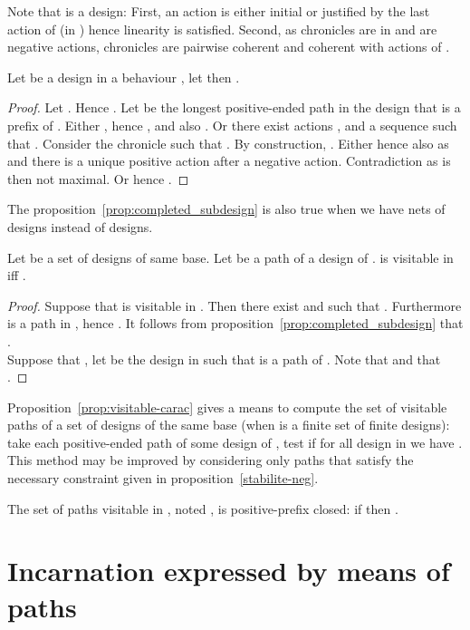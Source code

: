 \documentclass{LMCS}
\begin{document}
\noindent Note that  is a design:
First, an action  is either initial or justified by the last action of  (in ) hence linearity is satisfied.
Second, as chronicles  are in  and  are negative actions, chronicles  are pairwise coherent and coherent with actions of .

\begin{prop}\label{prop:completed_subdesign}
Let  be a design in a behaviour , let  then .
\end{prop}
\begin{proof}
Let . Hence . Let  be the longest positive-ended path in the design  that is a prefix of . 
Either , hence , and also . 
Or there exist actions ,  and a sequence  such that . 
Consider the chronicle  such that . By construction, . Either  hence also  as  and there is a unique positive action after a negative action. Contradiction as  is then not maximal. 
Or  hence .
\end{proof}

The proposition~\ref{prop:completed_subdesign} is also true when we have nets of designs instead of designs.

\begin{prop}\label{prop:visitable-carac}
Let  be a set of designs of same base.
Let  be a path of a design of .
 is visitable in  iff .
\end{prop}
\begin{proof}
Suppose that  is visitable in . Then there exist  and  such that . 
Furthermore  is a path in , hence . It follows from proposition~\ref{prop:completed_subdesign} that . \\
Suppose that , let  be the design in  such that  is a path of . Note that  and that .
\end{proof}

Proposition~\ref{prop:visitable-carac} gives a means to compute the set of visitable paths of a set  of designs of the same base (when  is a finite set of finite designs): take each positive-ended path  of some design of , test if for all design  in  we have . This method may be improved by considering only paths that satisfy the necessary constraint given in proposition~\ref{stabilite-neg}.

\begin{cor}
The set of paths visitable in , noted , is positive-prefix closed:
if  then .
\end{cor}




\section{Incarnation expressed by means of paths}\label{sec:Incarnation}
\end{document}
